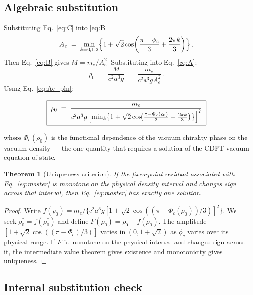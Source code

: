 \documentclass[11pt]{article}
\newtheorem{theorem}{Theorem}
\begin{document}
\subsection{Algebraic substitution}

Substituting Eq.~\eqref{eq:C} into \eqref{eq:B}:
\begin{equation}
  A_e \;=\; \min_{k=0,1,2}\Bigl\{1 + \sqrt{2}\cos\!\left(\frac{\pi - \phi_c}{3} + \frac{2\pi k}{3}\right)\Bigr\}\,.
  \label{eq:Ae_phi}
\end{equation}
Then Eq.~\eqref{eq:B} gives $M = m_e / A_e^2$.
Substituting into Eq.~\eqref{eq:A}:
\begin{equation}
  \rho_0 \;=\; \frac{M}{c^2 a^3 g} \;=\; \frac{m_e}{c^2 a^3 g A_e^2}\,.
  \label{eq:rho0_Ae}
\end{equation}
Using Eq.~\eqref{eq:Ae_phi}:

\begin{equation}
  \boxed{\;
  \rho_0 \;=\; \frac{m_e}{c^2 a^3 g\,
    \Bigl[\min_{k}\bigl\{1 + \sqrt{2}\cos\!\bigl(\tfrac{\pi - \Phi_c(\rho_0)}{3} + \tfrac{2\pi k}{3}\bigr)\bigr\}\Bigr]^2}
  \;}
  \label{eq:master}
\end{equation}

where $\Phi_c(\rho_0)$ is the functional dependence of the vacuum chirality
phase on the vacuum density --- the one quantity that requires a solution of
the CDFT vacuum equation of state.

\begin{theorem}[Uniqueness criterion]
  If the fixed-point residual associated with Eq.~\eqref{eq:master} is
  monotone on the physical density interval and changes sign across that
  interval, then Eq.~\eqref{eq:master} has exactly one solution.
\end{theorem}

\begin{proof}
  Write $f(\rho_0) = m_e / \{c^2 a^3 g [1 + \sqrt{2}\cos((\pi-\Phi_c(\rho_0))/3)]^2\}$.
  We seek $\rho_0^* = f(\rho_0^*)$ and define
  $F(\rho_0)=\rho_0-f(\rho_0)$.
  The amplitude $[1+\sqrt{2}\cos((\pi-\Phi_c)/3)]$ varies in $(0, 1+\sqrt{2})$
  as $\phi_c$ varies over its physical range.
  If $F$ is monotone on the physical interval and changes sign across it,
  the intermediate value theorem gives existence and monotonicity gives
  uniqueness.
\end{proof}

\subsection{Internal substitution check}
\end{document}
